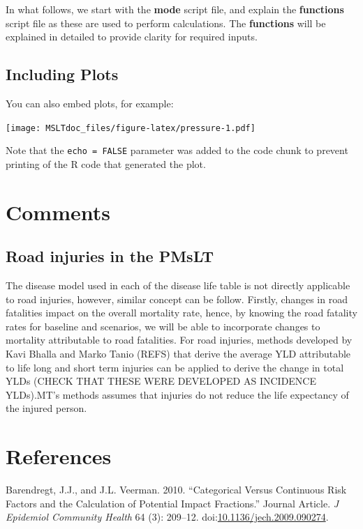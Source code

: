 \documentclass[]{article}
\begin{document}
In what follows, we start with the \textbf{mode} script file, and
explain the \textbf{functions} script file as these are used to perform
calculations. The \textbf{functions} will be explained in detailed to
provide clarity for required inputs.

\subsection{Including Plots}\label{including-plots}

You can also embed plots, for example:

\texttt{[image: MSLTdoc\_files/figure-latex/pressure-1.pdf]}

Note that the \texttt{echo\ =\ FALSE} parameter was added to the code
chunk to prevent printing of the R code that generated the plot.

\section{Comments}\label{comments}

\subsection{Road injuries in the
PMsLT}\label{road-injuries-in-the-pmslt}

The disease model used in each of the disease life table is not directly
applicable to road injuries, however, similar concept can be follow.
Firstly, changes in road fatalities impact on the overall mortality
rate, hence, by knowing the road fatality rates for baseline and
scenarios, we will be able to incorporate changes to mortality
attributable to road fatalities. For road injuries, methods developed by
Kavi Bhalla and Marko Tanio (REFS) that derive the average YLD
attributable to life long and short term injuries can be applied to
derive the change in total YLDs (CHECK THAT THESE WERE DEVELOPED AS
INCIDENCE YLDs).MT's methods assumes that injuries do not reduce the
life expectancy of the injured person.

\section*{References}\label{references}

\hypertarget{refs}{}
\hypertarget{ref-RN42}{}
Barendregt, J.J., and J.L. Veerman. 2010. ``Categorical Versus
Continuous Risk Factors and the Calculation of Potential Impact
Fractions.'' Journal Article. \emph{J Epidemiol Community Health} 64
(3): 209--12.
doi:\href{https://doi.org/10.1136/jech.2009.090274}{10.1136/jech.2009.090274}.
\end{document}
